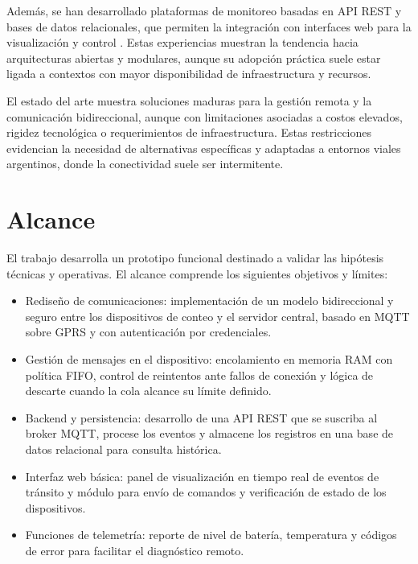 Además, se han desarrollado plataformas de monitoreo basadas en API REST y bases de datos relacionales, que permiten la integración con interfaces web para la visualización y control \cite{openRemoteSolution}. Estas experiencias muestran la tendencia hacia arquitecturas abiertas y modulares, aunque su adopción práctica suele estar ligada a contextos con mayor disponibilidad de infraestructura y recursos.

El estado del arte muestra soluciones maduras para la gestión remota y la comunicación bidireccional, aunque con limitaciones asociadas a costos elevados, rigidez tecnológica o requerimientos de infraestructura. Estas restricciones evidencian la necesidad de alternativas específicas y adaptadas a entornos viales argentinos, donde la conectividad suele ser intermitente.


\section{Alcance}
El trabajo desarrolla un prototipo funcional destinado a validar las hipótesis técnicas y operativas. El alcance comprende los siguientes objetivos y límites:

\begin{itemize}

\item Rediseño de comunicaciones: implementación de un modelo bidireccional y seguro entre los dispositivos de conteo y el servidor central, basado en MQTT sobre GPRS y con autenticación por credenciales.

\item Gestión de mensajes en el dispositivo: encolamiento en memoria RAM con política FIFO, control de reintentos ante fallos de conexión y lógica de descarte cuando la cola alcance su límite definido.

\item Backend y persistencia: desarrollo de una API REST que se suscriba al broker MQTT, procese los eventos y almacene los registros en una base de datos relacional para consulta histórica.

\item Interfaz web básica: panel de visualización en tiempo real de eventos de tránsito y módulo para envío de comandos y verificación de estado de los dispositivos.

\item Funciones de telemetría: reporte de nivel de batería, temperatura y códigos de error para facilitar el diagnóstico remoto.

\end{itemize}

